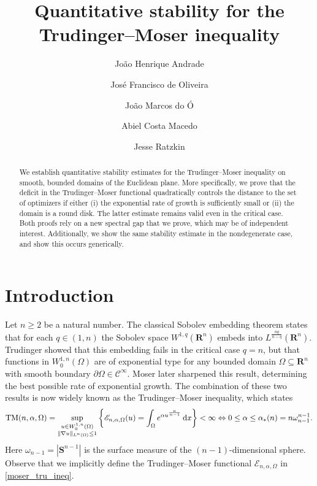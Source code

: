 \documentclass[reqno,11pt]{amsart}
\title[Quantitative stability for the Trudinger--Moser inequality]{Quantitative stability for the Trudinger--Moser inequality}
\author[J.H. Andrade]{Jo\~{a}o Henrique Andrade}
\author[J.F. de Oliveira]{Jos\'e Francisco de Oliveira}
\author[J.M. do \'O]{Jo\~{a}o Marcos do \'O}
\author[A. C. Macedo]{Abiel Costa Macedo}
\author[J. Ratzkin]{Jesse Ratzkin}
\theoremstyle{definition}
\newcommand{\ud}{\,\mathrm{d}}
\newcommand{\R}{\mathbf{R}}
\newcommand{\Ss}{\mathbf{S}}
\begin{document}
 

\begin{abstract}
We establish quantitative stability estimates for the Trudinger--Moser inequality on smooth, 
bounded domains of the Euclidean plane. More 
specifically, we prove that the deficit in the Trudinger--Moser functional quadratically controls the distance 
to the set of optimizers if either (i) the exponential rate of growth is sufficiently small 
or (ii) the domain is a 
round disk. The latter estimate remains valid even in the critical case. Both proofs rely on 
a new spectral gap that we prove, which may be of independent 
interest. Additionally, we show the same stability estimate in the nondegenerate case, and show this 
occurs generically.  
\end{abstract}

\maketitle

\section{Introduction}

Let $n\geq 2$ be a natural number. The classical Sobolev embedding theorem 
states that for each $q \in (1,n)$ the Sobolev 
space $W^{1,q}(\R^n)$ embeds into $L^{\frac{nq}{n-q}}(\R^n)$. Trudinger \cite{Trudinger67}
showed that this embedding fails in the critical case $q=n$, but that functions 
in $W^{1,n}_0(\Omega)$ are of exponential type for any bounded domain $\Omega\subseteq\mathbf{R}^n$ 
with smooth boundary $\partial\Omega\in \mathcal{C}^\infty$. Moser \cite{Moser1970/71} later 
sharpened this result, determining the 
best possible rate of exponential growth. The combination of these two 
results is now widely known as the Trudinger--Moser inequality, which states 
\begin{equation} \label{moser_tru_ineq} 
{\rm TM} (n, \alpha, \Omega) = \sup_{\substack{u \in W^{1,n}_0(\Omega)\\ 
\| \nabla u \|_{L^n (\Omega)}\leq 1}} \left \{ \mathscr{E}_{n, \alpha, \Omega} 
(u) = \int_\Omega e^{\alpha u^{\frac{n}{n-1}}} \ud x \right \} < \infty \Leftrightarrow 
0 \leq \alpha \leq \alpha_*(n) = n \omega_{n-1}^{n-1}.
\end{equation}
Here $\omega_{n-1} = |\Ss^{n-1}|$ is the surface measure of the $(n-1)$-dimensional sphere. Observe 
that we implicitly define the Trudinger--Moser functional $\mathscr{E}_{n,\alpha,\Omega}$ 
in \eqref{moser_tru_ineq}.
\end{document}
